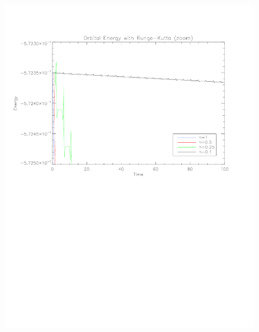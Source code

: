 \documentclass[11pt]{article}
\begin{document}
\begin{figure}
\centering
\includegraphics[scale = 0.75]{RKEnzoom.pdf}
\caption{}
\end{figure}
\end{document}
